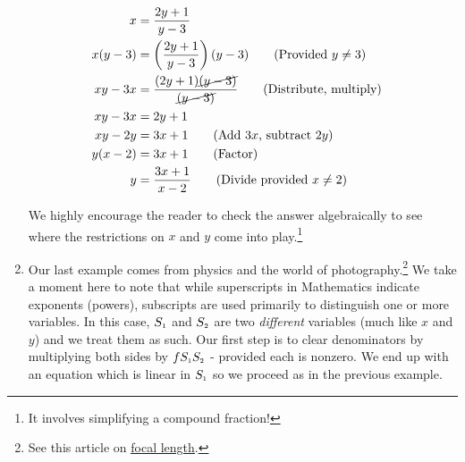 \begin{ex}
\begin{enumerate}
\begin{align*}
x & = \dfrac{2y+1}{y-3} & \\ 
x(y-3) & = \left(\dfrac{2y+1}{y-3}\right)(y-3) \tag{Provided $y \neq 3$} \\ 
xy - 3x & = \dfrac{(2y+1)\cancel{(y-3)}}{\cancel{(y-3)}} \tag{Distribute, multiply} \\ 
xy - 3x & = 2y + 1 & \\ 
xy - 2y & = 3x+1 \tag{Add $3x$, subtract $2y$} \\ 
y(x-2) & = 3x+1 \tag{Factor} \\ 
y & = \dfrac{3x+1}{x-2} \tag{Divide provided $x \neq 2$} \\
\end{align*}

We highly encourage the reader to check the answer algebraically to see where the restrictions on $x$ and $y$ come into play.\footnote{It involves simplifying a compound fraction!}

\item  Our last example comes from physics and the world of photography.\footnote{See this article on \href{https://en.wikipedia.org/wiki/Focal_length}{\underline{focal length}}.}  We take a moment here to note that while superscripts in Mathematics indicate exponents (powers), subscripts are used primarily to distinguish one or more variables.  In this case, $S_{\text{\tiny $1$}}$ and $S_{\text{\tiny $2$}}$ are two \textit{different} variables (much like $x$ and $y$) and we treat them as such. Our first step is to clear denominators by multiplying both sides by $f S_{\text{\tiny $1$}} S_{\text{\tiny $2$}}$ - provided each is nonzero.  We end up with an equation which is linear in $S_{\text{\tiny $1$}}$ so we proceed as in the previous example.


\end{enumerate}
\end{ex}
